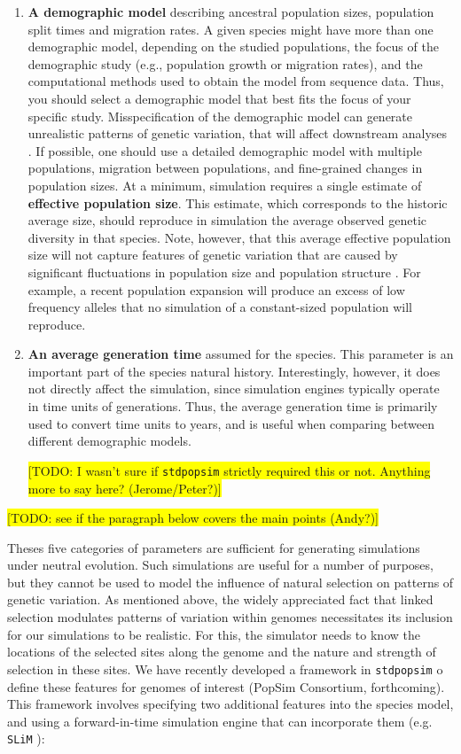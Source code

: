 \documentclass[hidelinks]{article}
\newcommand{\stdpopsim}{\texttt{stdpopsim}\xspace}
\begin{document}
\begin{enumerate}
\item
  \textbf{A demographic model} describing ancestral population sizes, population split times and migration rates. A given species might have more than one demographic model, depending on the studied populations, the focus of the demographic study (e.g., population growth or migration rates), and the computational methods used to obtain the model from sequence data. Thus, you should select a demographic model that best fits the focus of your specific study. Misspecification of the demographic model can generate unrealistic patterns of genetic variation, that will affect downstream analyses \citep[e.g.,][]{Navascues2009}. If possible, one should use a detailed demographic model with multiple populations, migration between populations, and fine-grained changes in population sizes. At a minimum, simulation requires a single estimate of \textbf{effective population size}. This estimate, which corresponds to the historic average size, should reproduce in simulation the average observed genetic diversity in that species. Note, however, that this average effective population size will not capture features of genetic variation that are caused by significant fluctuations in population size and population structure \citep{MacLeod2013}. For example, a recent population expansion will produce
  an excess of low frequency alleles that no simulation of a constant-sized
  population will reproduce.

\item
  \textbf{An average generation time} assumed for the species. 
  This parameter is an important part of the species natural history.
  Interestingly, however, it does not directly affect the simulation, since 
  simulation engines typically operate in time units of generations. Thus, the average generation time is primarily used to convert time units to years, and is useful when comparing between different demographic models.
  
  \colorbox{yellow}{[TODO: I wasn't sure if \stdpopsim strictly required this or not. Anything more to say here? (Jerome/Peter?)]}
  
\end{enumerate}

\colorbox{yellow}{[TODO: see if the paragraph below covers the main points (Andy?)]}

Theses five categories of parameters are sufficient for generating simulations
under neutral evolution. Such simulations are useful for a number of purposes,
but they cannot be used to model the influence of natural selection on patterns of genetic variation.
As mentioned above, the widely appreciated fact that linked selection modulates
patterns of variation within genomes necessitates its inclusion for our simulations to be
realistic. For this, the simulator needs to know
the locations of the selected sites along the genome and the nature and strength
of selection in these sites. We have recently developed a framework in \stdpopsim 
o define these features for genomes of interest (PopSim Consortium, forthcoming).
This framework involves specifying two additional features into the species model,
and using a forward-in-time simulation engine that can incorporate
them (e.g. \texttt{SLiM} \citep{Haller2019}):
\end{document}
